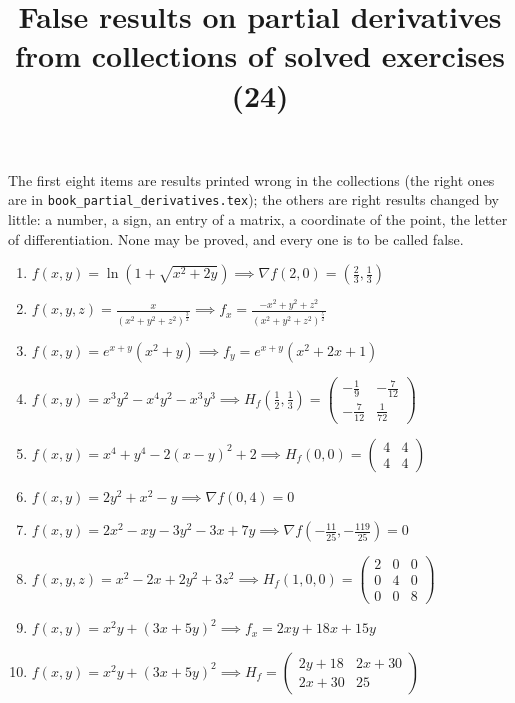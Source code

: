 \documentclass[11pt,a4paper]{article}
\title{False results on partial derivatives from collections of solved exercises (24)}
\author{}
\date{}
\begin{document}
\maketitle
The first eight items are results printed wrong in the collections (the right ones are in \texttt{book\_partial\_derivatives.tex}); the others are right results changed by little: a number, a sign, an entry of a matrix, a coordinate of the point, the letter of differentiation. None may be proved, and every one is to be called false.

\begin{enumerate}
\item $\displaystyle f(x, y) = \ln\left( 1 + \sqrt{x^{2} + 2y} \right) \implies \nabla f(2, 0) = \left( \frac{2}{3}, \frac{1}{3} \right)$
\item $\displaystyle f(x, y, z) = \frac{x}{(x^{2} + y^{2} + z^{2})^{\frac{3}{2}}} \implies f_{x} = \frac{-x^{2} + y^{2} + z^{2}}{(x^{2} + y^{2} + z^{2})^{\frac{5}{2}}}$
\item $\displaystyle f(x, y) = e^{x + y} (x^{2} + y) \implies f_{y} = e^{x + y} (x^{2} + 2x + 1)$
\item $\displaystyle f(x, y) = x^{3} y^{2} - x^{4} y^{2} - x^{3} y^{3} \implies H_{f}\left( \frac{1}{2}, \frac{1}{3} \right) = \begin{pmatrix} -\frac{1}{9} & -\frac{7}{12} \\ -\frac{7}{12} & \frac{1}{72} \end{pmatrix}$
\item $\displaystyle f(x, y) = x^{4} + y^{4} - 2(x - y)^{2} + 2 \implies H_{f}(0, 0) = \begin{pmatrix} 4 & 4 \\ 4 & 4 \end{pmatrix}$
\item $\displaystyle f(x, y) = 2y^{2} + x^{2} - y \implies \nabla f(0, 4) = 0$
\item $\displaystyle f(x, y) = 2x^{2} - xy - 3y^{2} - 3x + 7y \implies \nabla f\left( -\frac{11}{25}, -\frac{119}{25} \right) = 0$
\item $\displaystyle f(x, y, z) = x^{2} - 2x + 2y^{2} + 3z^{2} \implies H_{f}(1, 0, 0) = \begin{pmatrix} 2 & 0 & 0 \\ 0 & 4 & 0 \\ 0 & 0 & 8 \end{pmatrix}$
\item $\displaystyle f(x, y) = x^{2} y + (3x + 5y)^{2} \implies f_{x} = 2xy + 18x + 15y$
\item $\displaystyle f(x, y) = x^{2} y + (3x + 5y)^{2} \implies H_{f} = \begin{pmatrix} 2y + 18 & 2x + 30 \\ 2x + 30 & 25 \end{pmatrix}$

\end{enumerate}
\end{document}
